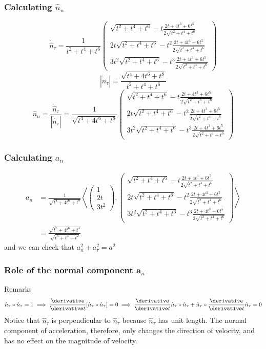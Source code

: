 \begin{frame}
\begin{example}
\frametitle{Calculating $\hat n_n$}
\[\dot{\hat{n}}_\tau=\frac{1}{t^2+t^4+t^6}\left(\begin{matrix}\sqrt{t^2+t^4+t^6}-t\frac{2t+4t^3+6t^5}{2\sqrt{t^2+t^4+t^6}}\\2t\sqrt{t^2+t^4+t^6}-t^2\frac{2t+4t^3+6t^5}{2\sqrt{t^2+t^4+t^6}}\\3t^2\sqrt{t^2+t^4+t^6}-t^3\frac{2t+4t^3+6t^5}{2\sqrt{t^2+t^4+t^6}}\end{matrix}\right)\]
\[
|\dot{\hat{n}}_\tau|=\frac{\sqrt{t^4+4t^6+t^8}}{t^2+t^4+t^6}
\]
\[\hat n_n=\frac{\dot{\hat{n}}_\tau}{|\dot{\hat{n}}_\tau|}=\frac{1}{\sqrt{t^4+4t^6+t^8}}\left(\begin{matrix}\sqrt{t^2+t^4+t^6}-t\frac{2t+4t^3+6t^5}{2\sqrt{t^2+t^4+t^6}}\\2t\sqrt{t^2+t^4+t^6}-t^2\frac{2t+4t^3+6t^5}{2\sqrt{t^2+t^4+t^6}}\\3t^2\sqrt{t^2+t^4+t^6}-t^3\frac{2t+4t^3+6t^5}{2\sqrt{t^2+t^4+t^6}}\end{matrix}\right)
\]
\end{example}
\end{frame}
\begin{frame}
\frametitle{Calculating $a_n$}
\begin{example}
\begin{align*}
a_n&=\frac{1}{\sqrt{t^4+4t^6+t^8}}\left<\left(\begin{matrix}1\\2t\\3t^2\end{matrix}\right),\left(\begin{matrix}\sqrt{t^2+t^4+t^6}-t\frac{2t+4t^3+6t^5}{2\sqrt{t^2+t^4+t^6}}\\2t\sqrt{t^2+t^4+t^6}-t^2\frac{2t+4t^3+6t^5}{2\sqrt{t^2+t^4+t^6}}\\3t^2\sqrt{t^2+t^4+t^6}-t^3\frac{2t+4t^3+6t^5}{2\sqrt{t^2+t^4+t^6}}\end{matrix}\right)\right>\\
&=\frac{\sqrt{t^8+4 t^6+t^4}}{\sqrt{t^6+t^4+t^2}}
\end{align*}
and we can check that \alert{$a_n^2+a_\tau^2=a^2$}
\end{example}

\end{frame}
\begin{frame}
\frametitle{Role of the normal component $\mathbf{a}_n$}
\begin{block}{Remarks}
\[
\hat n_\tau\circ\hat n_\tau=1\implies \frac{\derivative}{\derivative t}[\hat n_\tau\circ\hat n_\tau]=0\implies \frac{\derivative}{\derivative t}\hat n_\tau \circ \hat n_\tau+\hat n_\tau\circ\frac{\derivative}{\derivative t}\hat n_\tau=0
\]
Notice that $\dot{\hat{n}}_\tau$ is \alert{perpendicular} to $\hat n_\tau$ because $\hat n_\tau$ has \alert{unit length}.
The \alert{normal component} of acceleration, therefore, only changes the \alert{direction} of velocity, and has no effect on the magnitude of velocity.
\end{block}
\end{frame}
